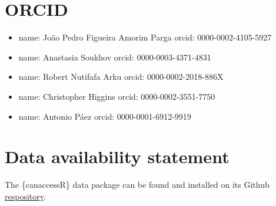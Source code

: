 \documentclass[Royal,times,sageh]{sagej}
\providecommand{\tightlist}{%
  \setlength{\itemsep}{0pt}\setlength{\parskip}{0pt}}
\begin{document}
\section{ORCID}\label{orcid}

\begin{itemize}
\tightlist
\item
  name: João Pedro Figueira Amorim Parga orcid: 0000-0002-4105-5927
\item
  name: Anastasia Soukhov orcid: 0000-0003-4371-4831
\item
  name: Robert Nutifafa Arku orcid: 0000-0002-2018-886X
\item
  name: Christopher Higgins orcid: 0000-0002-3551-7750
\item
  name: Antonio Páez orcid: 0000-0001-6912-9919
\end{itemize}

\section{Data availability statement}\label{data-availability-statement}

The \{canaccessR\} data package can be found and installed on its Github
\href{https://github.com/paezha/canaccessR}{respository}.



\end{document}
